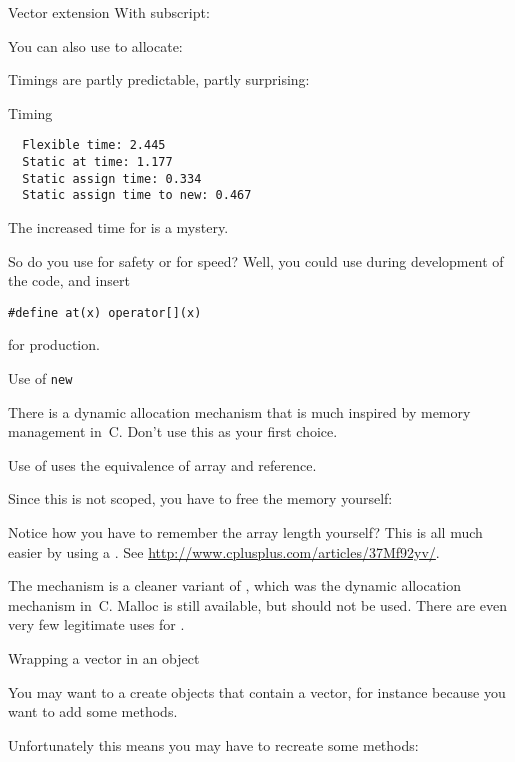 \begin{block}{Vector extension}
  \label{sl:vect-extend-code2}
  With subscript:

  You can also use  to allocate:
\end{block}

Timings are partly predictable, partly surprising:
\begin{block}{Timing}
  \label{sl:vector-extend-time}
\begin{verbatim}
  Flexible time: 2.445
  Static at time: 1.177
  Static assign time: 0.334
  Static assign time to new: 0.467
\end{verbatim}
\end{block}

The increased time for  is a mystery.

So do you use  for safety or \n{[]} for speed? Well, you could
use  during development of the code, and insert
\begin{verbatim}
#define at(x) operator[](x)
\end{verbatim}
for production.

 {Use of \texttt{new}}

\prerequisite{\ref{sec:arraypointer}}

There is a dynamic allocation mechanism that is much inspired by
memory management in~C. Don't use this as your first choice.

Use of  uses the 
equivalence of array and reference.
%

Since this is not scoped, you have to free the memory yourself:
%

Notice how you have to remember the array length yourself? This is all
much easier by using a . See
\url{http://www.cplusplus.com/articles/37Mf92yv/}.

The  mechanism is a cleaner variant of ,
which was the dynamic allocation mechanism in~C. Malloc is still
available, but should not be used. There are even very few legitimate
uses for .

 {Wrapping a vector in an object}

You may want to a create objects that contain a vector, for instance
because you want to add some methods.
%

Unfortunately this means you may have to recreate some methods:
%

